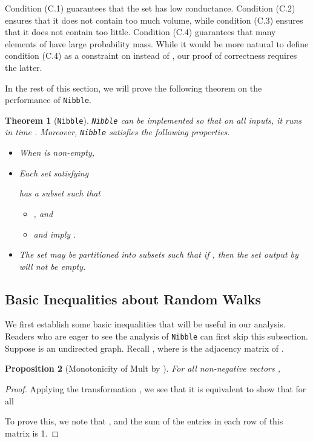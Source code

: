 \documentclass[11pt]{article}
\newtheorem{theorem}{Theorem}[section]
\newtheorem{proposition}[theorem]{Proposition}
\begin{document}
Condition (C.1) guarantees that the set  has low conductance.
Condition (C.2) ensures that it does not contain too much volume,
  while condition (C.3) ensures that it does not contain too little.
Condition (C.4) guarantees that many elements of 
  have large probability mass.
While it would be more natural to define condition (C.4) as a constraint
  on  instead of
  , our proof of correctness requires the latter.


In the rest of this section, we will
  prove the following theorem on the performance of \texttt{Nibble}.

\begin{theorem}[\texttt{Nibble}]\label{thm:Nibble}
\mbox{\rm \texttt{Nibble}}
  can be implemented so that
  on all inputs, it runs in time
  .
Moreover, \mbox{\rm \texttt{Nibble}} satisfies the following properties.
\begin{itemize}
\item [\mbox{\rm (N.1)}]
When
 is non-empty,

\item [\mbox{\rm (N.2)}]
  Each set  satisfying

has a subset  such that
\begin{itemize}
\item [\mbox{\rm (N.2.a)}] , and

\item [\mbox{\rm (N.2.b)}]   and
   imply
  .
\end{itemize}
\item [\mbox{\rm (N.3)}] The set  may be partitioned into
  subsets 
  such that if , then the
  set  output by 
  will not be empty.
\end{itemize}
\end{theorem}



\subsection{Basic Inequalities about Random Walks}

We first establish some basic inequalities
  that will be useful in our analysis.
Readers who are eager to see the analysis of \texttt{Nibble}
  can first skip this subsection.
Suppose  is an undirected graph.
Recall ,  where  is the
  adjacency matrix of .


\begin{proposition}[Monotonicity of Mult by ]\label{pro:infnorm}
For all non-negative vectors ,

\end{proposition}
\begin{proof}
Applying the transformation , we see that it
  is equivalent to show that for all 

To prove this, we note that
  ,
  and the sum of the entries in each row of this matrix is 1.
\end{proof}
\end{document}

